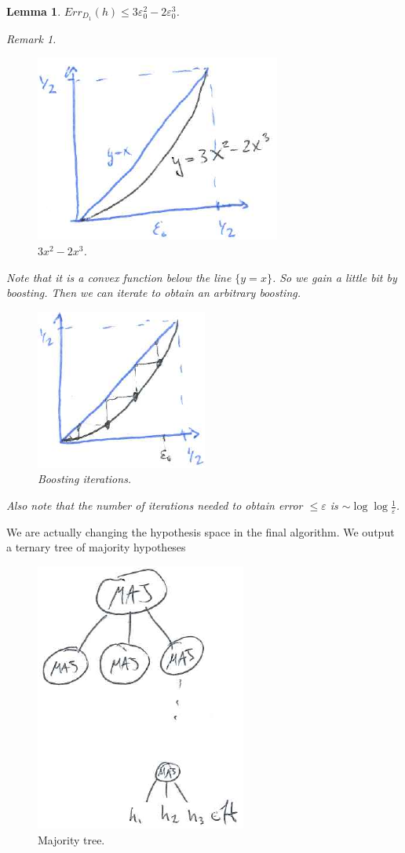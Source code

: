 \documentclass[12pt, letterpaper]{article}
\numberwithin{equation}{section} %
\newcommand{\ve}{\varepsilon}
\newtheorem{lemma}[theorem]{Lemma}
\theoremstyle{definition}
\theoremstyle{remark}
\newtheorem{remark}[theorem]{Remark}
\begin{document}
\begin{lemma}
$Err_{D_1}(h) \leq 3\ve_0^2 - 2\ve_0^3$.
\begin{remark}
\begin{figure}[H]
\centering
\includegraphics[width=0.3\linewidth]{../img/boosting-bound.png}
\caption{$3x^2 - 2x^3$.}
\end{figure}
Note that it is a convex function below the line $\lbrace y = x\rbrace$. So we gain a little bit by boosting. Then we can iterate to obtain an arbitrary boosting.
\begin{figure}[H]
\centering
\includegraphics[width=0.3\linewidth]{../img/boosting-iteration.png}
\caption{Boosting iterations.}
\end{figure}
Also note that the number of iterations needed to obtain error $\leq \ve$ is $\sim \log\log\frac1\ve$.
\end{remark}
\end{lemma}

We are actually changing the hypothesis space in the final algorithm. We output a ternary tree of majority hypotheses
\begin{figure}[H]
\centering
\includegraphics[width=0.3\linewidth]{../img/majority-tree.png}
\caption{Majority tree.}
\end{figure}
\end{document}
